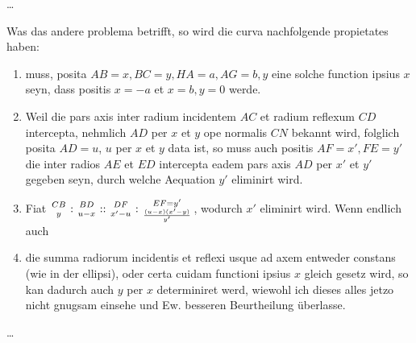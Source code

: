 \documentclass[10pt,a4paper]{article}
\newcommand*{\bfrac}[2]{\genfrac{}{}{0pt}{}{#1}{#2}}
\begin{document}
\begin{paracol}{2}
	\par \ldots
	\par Was das andere problema betrifft, so wird die curva nachfolgende propietates haben:
	\begin{enumerate}
		\item muss, posita $AB=x, BC=y, HA=a, AG=b, y$ eine solche function ipsius $x$ seyn, dass positis $x=-a$ et $x=b, y=0$ werde.
		\item Weil die pars axis inter radium incidentem $AC$ et radium reflexum $CD$ intercepta, nehmlich $AD$ per $x$ et $y$ ope normalis $CN$ bekannt wird, folglich posita $AD=u$, $u$ per $x$ et $y$ data ist, so muss auch positis $AF=x', FE=y'$ die inter radios $AE$ et $ED$ intercepta eadem pars axis $AD$ per $x'$ et $y'$ gegeben seyn, durch welche Aequation $y'$ eliminirt wird.
		\item Fiat $\bfrac{CB}{y}:\bfrac{BD}{u-x}::\bfrac{DF}{x'-u}:\bfrac{EF=y'}{\frac{(u-x)(x'-y)}{y'}}$, wodurch $x'$ eliminirt wird. Wenn endlich auch
		\item die summa radiorum incidentis et reflexi usque ad axem entweder constans (wie in der ellipsi), oder certa cuidam functioni ipsius $x$ gleich gesetz wird, so kan dadurch auch $y$ per $x$ determiniret werd, wiewohl ich dieses alles jetzo nicht gnugsam einsehe und Ew. besseren Beurtheilung überlasse.
	\end{enumerate}
	
	\switchcolumn
	\par \ldots
	
	\switchcolumn*
	

\end{paracol}
\end{document}
